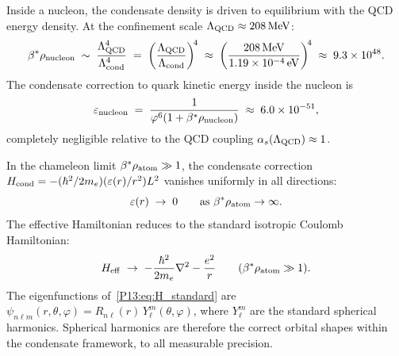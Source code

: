 

\begin{proposition}
\label{P5:prop:qcd_chameleon}
Inside a nucleon, the condensate density is driven to equilibrium
with the QCD energy density.
At the confinement scale $\Lambda_{\mathrm{QCD}}\approx208\,\mathrm{MeV}$:
\begin{equation}
  \beta^{*}\rho_{\mathrm{nucleon}}
  \;\sim\; \frac{\Lambda_{\mathrm{QCD}}^4}{\Lambda_{\mathrm{cond}}^4}
  \;=\; \left(\frac{\Lambda_{\mathrm{QCD}}}{\Lambda_{\mathrm{cond}}}\right)^{\!4}
  \;\approx\; \left(\frac{208\,\mathrm{MeV}}{1.19\times10^{-4}\,\mathrm{eV}}\right)^{\!4}
  \;\approx\; 9.3\times10^{48}.
  \label{P13:eq:rho_nucleon}
\end{equation}
The condensate correction to quark kinetic energy inside the nucleon is
\begin{equation}
  \varepsilon_{\mathrm{nucleon}}
  \;=\; \frac{1}{\varphi^6(1+\beta^{*}\rho_{\mathrm{nucleon}})}
  \;\approx\; 6.0\times10^{-51},
  \label{P13:eq:eps_nucleon}
\end{equation}
completely negligible relative to the QCD coupling $\alpha_s(\Lambda_{\mathrm{QCD}})\approx1$.
\end{proposition}

\begin{theorem}
\label{P13:thm:chameleon_screening}
In the chameleon limit $\beta^{*}\rho_{\mathrm{atom}}\gg1$, the condensate correction
$H_{\mathrm{cond}} = -(\hbar^2/2m_e)(\varepsilon(r)/r^2)L^2$ vanishes uniformly
in all directions:
\begin{equation}
  \varepsilon(r) \;\to\; 0
  \qquad \text{as } \beta^{*}\rho_{\mathrm{atom}} \to \infty.
  \label{P13:eq:chameleon_limit}
\end{equation}
The effective Hamiltonian reduces to the standard isotropic
Coulomb Hamiltonian:
\begin{equation}
  H_{\mathrm{eff}} \;\to\; -\frac{\hbar^2}{2m_e}\nabla^2 - \frac{e^2}{r}
  \qquad (\beta^{*}\rho_{\mathrm{atom}} \gg 1).
  \label{P13:eq:H_standard}
\end{equation}
The eigenfunctions of~\eqref{P13:eq:H_standard} are
$\psi_{n\ell m}(r,\theta,\varphi) = R_{n\ell}(r)\,Y_\ell^m(\theta,\varphi)$,
where $Y_\ell^m$ are the standard spherical harmonics.
Spherical harmonics are therefore the correct orbital shapes
within the condensate framework, to all measurable precision.
\end{theorem}


